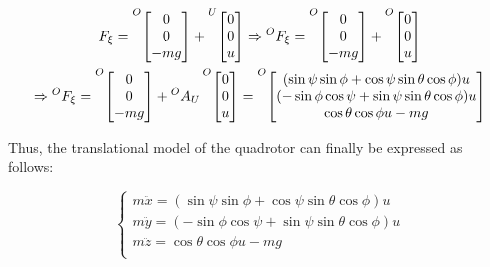 \documentclass{thesisreport}
\begin{document}
\begin{multline}
F_{\xi}= \prescript{O}{}{\begin{bmatrix}
0\\
0\\
-mg
\end{bmatrix}} + \prescript{U}{}{\begin{bmatrix}
0 \\
0 \\
u \\
\end{bmatrix}} \Rightarrow {}^{O}F_{\xi} = \prescript{O}{}{\begin{bmatrix}
0\\
0\\
-mg
\end{bmatrix}} + \prescript{O}{}{\begin{bmatrix}
0 \\
0 \\
u \\
\end{bmatrix}}\\
\Rightarrow {}^{O}F_{\xi} =  \prescript{O}{}{\begin{bmatrix}
0 \\
0 \\
-mg \\
\end{bmatrix}} + {}^{O}A_U  \prescript{O}{}{\begin{bmatrix}
0 \\
0 \\
u \\
\end{bmatrix}} = \prescript{O}{}{\begin{bmatrix}
(\sin \psi \sin \phi + \cos \psi \sin \theta \cos \phi)u \\
(- \sin \phi \cos \psi + \sin \psi \sin \theta \cos \phi )u \\
\cos \theta \cos \phi u -mg \\
\end{bmatrix}}
\end{multline}

Thus, the translational model of the quadrotor can finally be expressed as follows:


\begin{equation}\label{translational_model_E_L}
\begin{cases}
m \ddot{x} = (\sin \psi \sin \phi + \cos \psi \sin \theta \cos \phi)u \\
m \ddot{y} = (- \sin \phi \cos \psi + \sin \psi \sin \theta \cos \phi )u \\
m \ddot{z} = \cos \theta \cos \phi u -mg \\
\end{cases}
\end{equation}
\end{document}
